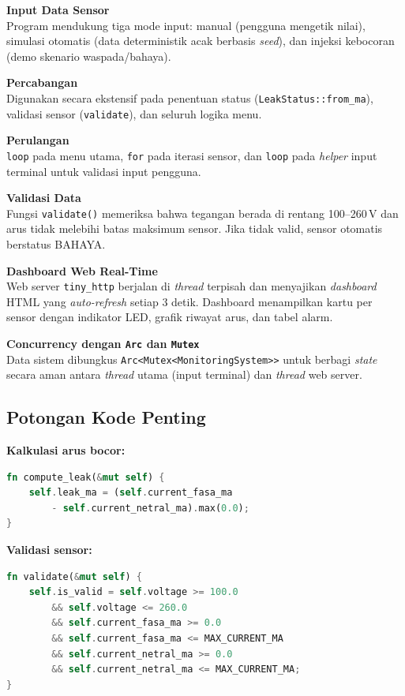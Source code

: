 \documentclass[12pt,a4paper]{article}
\begin{document}
\textbf{Input Data Sensor}\\
Program mendukung tiga mode input: manual (pengguna mengetik nilai), simulasi
otomatis (data deterministik acak berbasis \emph{seed}), dan injeksi kebocoran
(demo skenario waspada/bahaya).

\textbf{Percabangan}\\
Digunakan secara ekstensif pada penentuan status (\texttt{LeakStatus::from\_ma}),
validasi sensor (\texttt{validate}), dan seluruh logika menu.

\textbf{Perulangan}\\
\texttt{loop} pada menu utama, \texttt{for} pada iterasi sensor, dan \texttt{loop}
pada \emph{helper} input terminal untuk validasi input pengguna.

\textbf{Validasi Data}\\
Fungsi \texttt{validate()} memeriksa bahwa tegangan berada di rentang 100--260\,V
dan arus tidak melebihi batas maksimum sensor. Jika tidak valid, sensor otomatis
berstatus BAHAYA.

\textbf{Dashboard Web Real-Time}\\
Web server \texttt{tiny\_http} berjalan di \emph{thread} terpisah dan menyajikan
\emph{dashboard} HTML yang \emph{auto-refresh} setiap 3 detik. Dashboard
menampilkan kartu per sensor dengan indikator LED, grafik riwayat arus, dan tabel
alarm.

\textbf{Concurrency dengan \texttt{Arc} dan \texttt{Mutex}}\\
Data sistem dibungkus \texttt{Arc<Mutex<MonitoringSystem>{}>} untuk berbagi
\emph{state} secara aman antara \emph{thread} utama (input terminal) dan
\emph{thread} web server.

\subsection{Potongan Kode Penting}

\textbf{Kalkulasi arus bocor:}
\begin{lstlisting}[language=Rust, caption={Fungsi compute\_leak}]
fn compute_leak(&mut self) {
    self.leak_ma = (self.current_fasa_ma
        - self.current_netral_ma).max(0.0);
}
\end{lstlisting}

\textbf{Validasi sensor:}
\begin{lstlisting}[language=Rust, caption={Fungsi validate}]
fn validate(&mut self) {
    self.is_valid = self.voltage >= 100.0
        && self.voltage <= 260.0
        && self.current_fasa_ma >= 0.0
        && self.current_fasa_ma <= MAX_CURRENT_MA
        && self.current_netral_ma >= 0.0
        && self.current_netral_ma <= MAX_CURRENT_MA;
}
\end{lstlisting}
\end{document}
